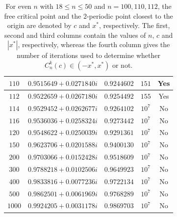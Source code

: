 \documentclass[12pt]{article}
\begin{document}
\begin{table}[h!]
\begin{tabular}{|c|c|c|c|c|}
		\hline
		$110$ & $0.9515649 + 0.0271840 i$ & $0.9244602$ & $151$    & Yes \\
		\hline
		$112$ & $0.9522659 + 0.0267180 i$ & $0.9254492$ & $155$    & Yes \\
		\hline
		$114$ & $0.9529452 + 0.0262677 i$ & $0.9264102$ & $10^{7}$ & No \\
 		\hline
 		$116$ & $0.9536036 + 0.0258324 i$ & $0.9273442$ &  $10^{7}$ & No \\
		\hline
		$120$ & $0.9548622 + 0.0250039 i$ & $0.9291361$ &  $10^{7}$ & No \\
		\hline
		$150$ & $0.9623706 + 0.0201588 i$ & $0.9400130$ &  $10^{7}$ & No \\
		\hline
		$200$ & $0.9703066 + 0.0152428 i$ & $0.9518609$ &  $10^{7}$ & No \\
		\hline
		$300$ & $0.9788218 + 0.0102506 i$ & $0.9649923$ &  $10^{7}$ & No \\
		\hline
		$400$ & $0.9833816 + 0.0077236 i$ & $0.9722134$ &  $10^{7}$ & No \\
		\hline
		$500$ & $0.9862501 + 0.0061969 i$ & $0.9768289$ &  $10^{7}$ & No \\
		\hline
		$1000$ & $0.9924205 + 0.0031178 i$ & $0.9869703$ &  $10^{7}$ & No \\
		\hline
	\end{tabular}
	\caption{For even $n$ with $18 \leq n\leq 50$ and $n=100,110,112$, the free critical point and the $2$-periodic point closest to the origin are denoted by $c$ and $x^*$, respectively.  The first, second  and third columns contain the values of $n$, $c$ and $|x^*|$, respectively, whereas the fourth column gives the number of iterations used to determine whether  $C_n ^k (c) \in (-x^*, x^*)$ or not.  }
	\label{tab:free_critical_point_convergence}
\end{table}
\end{document}
